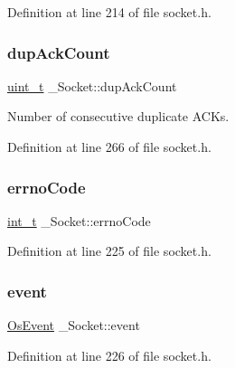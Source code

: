 Definition at line 214 of file socket.\+h.

\mbox{\label{struct__Socket_a7ed4d702f4bfdc9f60a73501b81474ff}} 
\subsubsection{\texorpdfstring{dup\+Ack\+Count}{dupAckCount}}
{\footnotesize\ttfamily \hyperlink{compiler__port_8h_a12a1e9b3ce141648783a82445d02b58d}{uint\+\_\+t} \+\_\+\+Socket\+::dup\+Ack\+Count}



Number of consecutive duplicate A\+C\+Ks. 



Definition at line 266 of file socket.\+h.

\mbox{\label{struct__Socket_aee3167da0ccb8f0f3da2d338a4a64647}} 
\subsubsection{\texorpdfstring{errno\+Code}{errnoCode}}
{\footnotesize\ttfamily \hyperlink{compiler__port_8h_a022c65af7f6c8d3947e8a37d64db6ad6}{int\+\_\+t} \+\_\+\+Socket\+::errno\+Code}



Definition at line 225 of file socket.\+h.

\mbox{\label{struct__Socket_a4405b0252467b2cd50e19867f1ffa021}} 
\subsubsection{\texorpdfstring{event}{event}}
{\footnotesize\ttfamily \hyperlink{structOsEvent}{Os\+Event} \+\_\+\+Socket\+::event}



Definition at line 226 of file socket.\+h.

\mbox{\label{struct__Socket_ac7d6b7677f09b832f12acccf44574b00}} 
